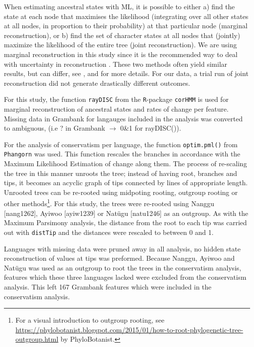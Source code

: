 \documentclass[draft,10pt]{article} %
\begin{document}
When estimating ancestral states with ML, it is possible to either a) find the state at each node that maximises the likelihood (integrating over all other states at all nodes, in proportion to their probability) at that particular node (marginal reconstruction), or b) find the set of character states at all nodes that (jointly) maximize the likelihood of the entire tree (joint reconstruction). We are using marginal reconstruction in this study since it is the recommended way to deal with uncertainty in reconstruction \citep{revell_2014}. These two methods often yield similar results, but can differ, see \citet[259-260]{felsenstein2004inferring},  \citet[121-126]{yang2006computational} and \citet[5]{joy2016ancestral} for more details. For our data, a trial run of joint reconstruction did not generate drastically different outcomes.

For this study, the function \texttt{rayDISC} from the \texttt{R}-package \texttt{corHMM} \citep{corHMM} is used for marginal reconstruction of ancestral states and rates of change per feature. Missing data in Grambank for langauges included in the analysis was converted to ambiguous, (i.e ? in Grambank $\rightarrow$ 0\&1 for rayDISC()). 

For the analysis of conservatism per language, the function \texttt{optim.pml()} from \texttt{Phangorn} \citep{phangorn} was used. This function rescales the branches in accordance with the Maximum Likelihood Estimation of change along them. The process of re-scaling the tree in this manner unroots the tree; instead of having root, branches and tips, it becomes an acyclic graph of tips connected by lines of appropriate length. Unrooted trees can be re-rooted using midpoting rooting, outgroup rooting or other methods\footnote{For a visual introduction to outgroup rooting, see \href{this blogpost}{https://phylobotanist.blogspot.com/2015/01/how-to-root-phylogenetic-tree-outgroup.html} by PhyloBotanist.}. For this study, the trees were re-rooted using Nanggu [nang1262], Ayiwoo [ayiw1239] or Natügu [natu1246] as an outgroup. As with the Maximum Parsimony analysis, the distance from the root to each tip was carried out with \texttt{distTip} and the distances were rescaled to between 0 and 1. 

Languages with missing data were pruned away in all analysis, no hidden state reconstruction of values at tips was preformed. Because Nanggu, Ayiwoo and Natügu was used as an outgroup to root the trees in the conservatism analysis, features which these three languages lacked were excluded from the conservatism analysis. This left 167 Grambank features which were included in the conservatism analysis. %
\end{document}
